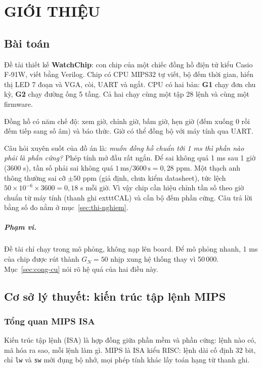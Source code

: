 \chapter{GIỚI THIỆU}

\section{Bài toán}\label{sec:bai-toan}
Đề tài thiết kế \textbf{WatchChip}: con chip của một chiếc đồng hồ điện tử kiểu Casio F-91W, viết bằng Verilog. Chip có CPU MIPS32 tự viết, bộ đếm thời gian, hiển thị LED 7 đoạn và VGA, còi, UART và ngắt. CPU có hai bản: \textbf{G1} chạy đơn chu kỳ, \textbf{G2} chạy đường ống 5 tầng. Cả hai chạy cùng một tập 28 lệnh và cùng một firmware.

Đồng hồ có năm chế độ: xem giờ, chỉnh giờ, bấm giờ, hẹn giờ (đếm xuống 0 rồi đếm tiếp sang số âm) và báo thức. Giờ có thể đồng bộ với máy tính qua UART.

Câu hỏi xuyên suốt của đồ án là: \emph{muốn đồng hồ chuẩn tới 1 ms thì phần nào phải là phần cứng?} Phép tính mở đầu rất ngắn. Để sai không quá 1 ms sau 1 giờ (3600 s), tần số phải sai không quá $1\,\text{ms} / 3600\,\text{s} = 0{,}28$ ppm. Một thạch anh thông thường sai cỡ $\pm 50$ ppm (giả định, chưa kiểm datasheet), tức lệch $50 \times 10^{-6} \times 3600 = 0{,}18$ s mỗi giờ. Vì vậy chip cần hiệu chỉnh tần số theo giờ chuẩn từ máy tính (thanh ghi 	exttt{CAL}) và cần bộ đếm phần cứng. Câu trả lời bằng số đo nằm ở mục~\ref{sec:thi-nghiem}.

\paragraph{Phạm vi.} Đề tài chỉ chạy trong mô phỏng, không nạp lên board. Để mô phỏng nhanh, 1 ms của chip được rút thành $G_N = 50$ nhịp xung hệ thống thay vì 50\,000. Mục~\ref{sec:cong-cu} nói rõ hệ quả của hai điều này.

\section{Cơ sở lý thuyết: kiến trúc tập lệnh MIPS}\label{sec:mips}
\subsection{Tổng quan MIPS ISA}
Kiến trúc tập lệnh (ISA) là hợp đồng giữa phần mềm và phần cứng: lệnh nào có, mã hóa ra sao, mỗi lệnh làm gì. MIPS là ISA kiểu RISC: lệnh dài cố định 32 bit, chỉ \texttt{lw} và \texttt{sw} mới đụng bộ nhớ, mọi phép tính khác lấy toán hạng từ thanh ghi.

